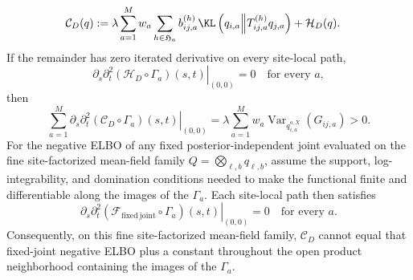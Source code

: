 \begin{align}
\mathcal C_D(q)
:={}&\lambda\sum_{a=1}^{M}w_a
\sum_{h\in\mathfrak H_a}b_{ij,a}^{(h)}
\KL\left(q_{i,a}\middle\Vert T_{ij,a}^{(h)}q_{j,a}\right)
+\mathcal H_D(q).
\label{eq:moving-peer-finite-functional}
\end{align}
If the remainder has zero iterated derivative on every site-local path,
\begin{equation}
\left.\partial_s\partial_t^2
(\mathcal H_D\circ\Gamma_a)(s,t)\right|_{(0,0)}=0
\quad\text{for every \(a\)},
\label{eq:moving-peer-remainder-no-cancellation}
\end{equation}
then
\begin{equation}
\sum_{a=1}^{M}
\left.\partial_s\partial_t^2
(\mathcal C_D\circ\Gamma_a)(s,t)\right|_{(0,0)}
=\lambda\sum_{a=1}^{M}w_a
\operatorname{Var}_{q_{i,a}^{o,X}}(G_{ij,a})>0.
\label{eq:moving-peer-mixed-third}
\end{equation}
For the negative ELBO of any fixed posterior-independent joint evaluated on the fine site-factorized mean-field family \(Q=\bigotimes_{\ell,b}q_{\ell,b}\), assume the support, log-integrability, and domination conditions needed to make the functional finite and differentiable along the images of the \(\Gamma_a\). Each site-local path then satisfies
\begin{equation}
\left.\partial_s\partial_t^2
(\mathcal F_{\mathrm{fixed\ joint}}\circ\Gamma_a)(s,t)
\right|_{(0,0)}=0
\quad\text{for every \(a\)}.
\label{eq:fixed-joint-mixed-third-zero}
\end{equation}
Consequently, on this fine site-factorized mean-field family, \(\mathcal C_D\) cannot equal that fixed-joint negative ELBO plus a constant throughout the open product neighborhood containing the images of the \(\Gamma_a\).

